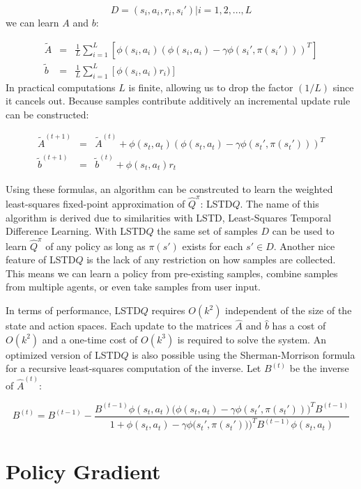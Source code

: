 \[
    D = { (s_i,a_i,r_i,s_i') | i = 1,2,...,L}
\]
we can learn $A$ and $b$:

\[
    \begin{array}{rcl}
        \tilde{A} &=& \frac{1}{L}\displaystyle\sum_{i=1}^L[\phi(s_i,a_i)(\phi(s_i,a_i) - \gamma\phi(s_i',\pi(s_i')))^T] \\
        \tilde{b} &=& \frac{1}{L}\displaystyle\sum_{i=1}^L[\phi(s_i,a_i)r_i)]
    \end{array}
\]
In practical computations $L$ is finite, allowing us to drop the factor $(1/L)$ since it cancels out. Because samples contribute additively an incremental update rule can be constructed:

\[
    \begin{array}{rcl}
        \tilde{A}^{(t+1)} &=& \tilde{A}^{(t)} + \phi(s_t,a_t)(\phi(s_t,a_t) - \gamma\phi(s_t',\pi(s_t')))^T \\
        \tilde{b}^{(t+1)} &=& \tilde{b}^{(t)} + \phi(s_t,a_t)r_t
    \end{array}
\]

Using these formulas, an algorithm can be constrcuted to learn the weighted least-squares fixed-point approximation of $\hat{Q}^\pi$: LSTD$Q$. The name of this algorithm is derived due to similarities with LSTD, Least-Squares Temporal Difference Learning. With LSTD$Q$ the same set of samples $D$ can be used to learn $\hat{Q}^\pi$ of any policy as long as $\pi(s')$ exists for each $s' \in D$. Another nice feature of LSTD$Q$ is the lack of any restriction on how samples are collected. This means we can learn a policy from pre-existing samples, combine samples from multiple agents, or even take samples from user input.

In terms of performance, LSTD$Q$ requires $O(k^2)$ independent of the size of the state and action spaces. Each update to the matrices $\hat{A}$ and $\hat{b}$ has a cost of $O(k^2)$ and a one-time cost of $O(k^3)$ is required to solve the system. An optimized version of LSTD$Q$ is also possible using the Sherman-Morrison formula for a recursive least-squares computation of the inverse. Let $B^{(t)}$ be the inverse of $\hat{A}^{(t)}$:

\[
    B^{(t)} = B^{(t-1)} - \frac{B^{(t-1)}\phi(s_t,a_t)\big(\phi(s_t,a_t) - \gamma\phi(s_t',\pi(s_t'))\big)^TB^{(t-1)}}{1 + \phi(s_t,a_t) - \gamma\phi\big(s_t',\pi(s_t'))\big)^TB^{(t-1)}\phi(s_t,a_t)}
\]

\section{Policy Gradient}